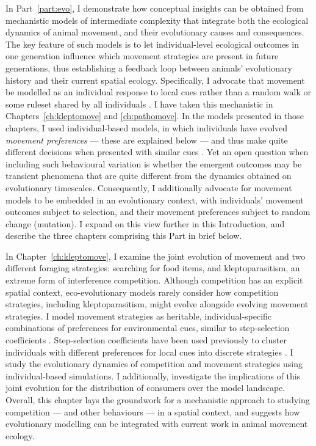In Part~\ref{part:evo}, I demonstrate how conceptual insights can be obtained from mechanistic models of intermediate complexity that integrate both the ecological dynamics of animal movement, and their evolutionary causes and consequences.
The key feature of such models is to let individual-level ecological outcomes in one generation influence which movement strategies are present in future generations, thus establishing a feedback loop between animals' evolutionary history and their current spatial ecology.
Specifically, I advocate that movement be modelled as an individual response to local cues rather than a random walk or some ruleset shared by all individuals \citep[see][]{mueller2011}.
I have taken this mechanistic in Chapters~\ref{ch:kleptomove} and \ref{ch:pathomove}.
In the models presented in those chapters, I used individual-based models, in which individuals have evolved \emph{movement preferences} --- these are explained below --- and thus make quite different decisions when presented with similar cues \citep{getz2015,white2018}.
Yet an open question when including such behavioural variation is whether the emergent outcomes may be transient phenomena that are quite different from the dynamics obtained on evolutionary timescales.
Consequently, I additionally advocate for movement models to be embedded in an evolutionary context, with individuals' movement outcomes subject to selection, and their movement preferences subject to random change (mutation).
I expand on this view further in this Introduction, and describe the three chapters comprising this Part in brief below.

In Chapter~\ref{ch:kleptomove}, I examine the joint evolution of movement and two different foraging strategies: searching for food items, and kleptoparasitism, an extreme form of interference competition.
Although competition has an explicit spatial context, eco-evolutionary models rarely consider how competition strategies, including kleptoparasitism, might evolve alongside evolving movement strategies.
I model movement strategies as heritable, individual-specific combinations of preferences for environmental cues, similar to step-selection coefficients \parencite{fortin2005,manly2002}.
Step-selection coefficients have been used previously to cluster individuals with different preferences for local cues into discrete strategies \parencite{bastille-rousseau2019}.
I study the evolutionary dynamics of competition and movement strategies using individual-based simulations.
I additionally, investigate the implications of this joint evolution for the distribution of consumers over the model landscape.
Overall, this chapter lays the groundwork for a mechanistic approach to studying competition --- and other behaviours --- in a spatial context, and suggests how evolutionary modelling can be integrated with current work in animal movement ecology.

